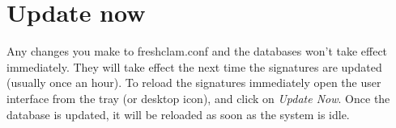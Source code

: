 \section{Update now}
\label{sec:updatenow}
Any changes you make to \gls{freshclam.conf} and the databases won't take effect immediately.
They will take effect the next time the signatures are updated (usually once an hour).
To reload the signatures immediately open the \CW user interface from the tray (or desktop icon), and click on \emph{Update Now}. 
Once the database is updated, it will be reloaded as soon as the system is idle.
